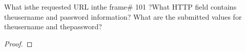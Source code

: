 \documentclass[../../main.tex]{subfiles}
\begin{document}
\begin{wts}
What isthe requested URL inthe frame# 101 ?What HTTP field contains theusername and password information? What are the submitted values for theusername and thepassword?
\end{wts}
\begin{proof}

\end{proof}
\end{document}
